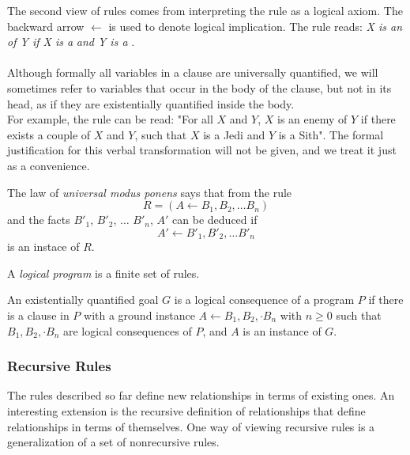 The second view of rules comes from interpreting the rule as a logical axiom. The backward arrow $\leftarrow$ is used to denote logical implication. The  rule reads: \textit{X is an}  \textit{of Y if X is a}  \textit{and Y is a} .\\\\
Although formally all variables in a clause are universally quantified, we will sometimes refer to variables that occur in the body of the clause, but not in its head, as if they are existentially quantified inside the body.\\

For example, the  rule can be read: "For all $X$ and $Y$, $X$ is an enemy of $Y$ if there exists a couple of $X$ and $Y$, such that $X$ is a Jedi and $Y$ is a Sith". The formal justification for this verbal transformation will not be given, and we treat it just as a convenience.\\
\begin{definition*}
	The law of \textit{universal modus ponens} says that from the rule $$R = (A \leftarrow B_1, B_2, \dots B_n)$$ and the facts $B'_1$, $B'_2$, $\dots$ $B'_n$, $A'$ can be deduced if  $$A' \leftarrow B'_1, B'_2, \dots B'_n$$ is an instace of $R$.\\
\end{definition*}
\begin{definition*}
	A \textit{logical program} is a finite set of rules.\\
\end{definition*}
\begin{definition*}
	An existentially quantified goal $G$ is a logical consequence of a program $P$ if there is a clause in $P$ with a ground instance $A \leftarrow B_1, B_2, \cdot B_n$ with $n \geq 0$ such that $B_1, B_2, \cdot B_n$ are logical consequences of $P$, and $A$ is an instance of $G$.
\end{definition*}
\subsubsection{Recursive Rules} \label{ch:recursive-rules}
The rules described so far define new relationships in terms of existing ones. An interesting extension is the recursive definition of relationships that define relationships in terms of themselves. One way of viewing recursive rules is a generalization of a set of nonrecursive rules.\\

